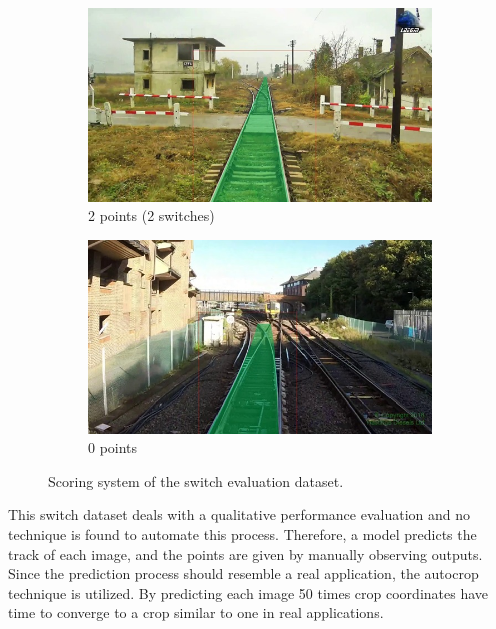 \begin{figure}[H]
    \begin{subfigure}[b]{0.48\textwidth}
        \centering
        \includegraphics[width=\textwidth]{PICs/usedDatasets/2punkte.jpg}
        \caption{2 points (2 switches)}
    \end{subfigure}
    \hfill
    \begin{subfigure}[b]{0.48\textwidth}
        \centering
        \includegraphics[width=\textwidth]{PICs/usedDatasets/0punkte.jpg}
        \caption{0 points}
    \end{subfigure}
    \caption{Scoring system of the switch evaluation dataset.}
    \label{fig:pointSystem}
\end{figure}

\noindent This switch dataset deals with a qualitative performance evaluation and no technique is found to automate this process.
Therefore, a model predicts the track of each image, and the points are given by manually observing outputs.
Since the prediction process should resemble a real application, the autocrop technique is utilized.
By predicting each image 50 times crop coordinates have time to converge to a crop similar to one in real applications.

